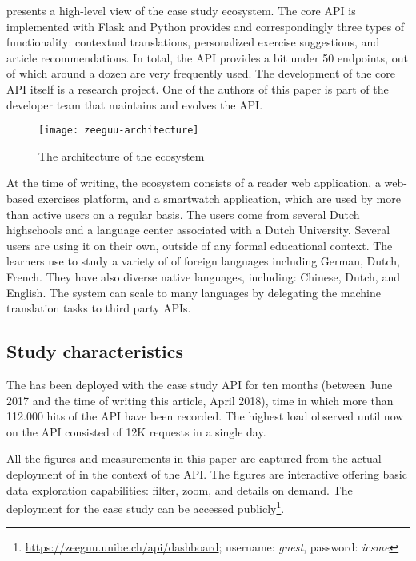    presents a high-level view of the case study ecosystem.  The core API is implemented with Flask and Python provides and correspondingly three types of functionality: contextual translations, personalized exercise suggestions, and article recommendations. In total, the API provides a bit under 50 endpoints, out of which around a dozen are very frequently used. The development of the core API itself is a research project. One of the authors of this paper is part of the developer team that maintains and evolves the \zee API. 


    \begin{figure}[h!]
      \centering
      \texttt{[image: zeeguu-architecture]}
      \caption{The architecture of the \zee ecosystem}
      \label{fig:zeeguuarch}
    \end{figure}  


  At the time of writing, the ecosystem consists of a reader web application, a web-based exercises platform, and a smartwatch application, which are used by more than \activeUserCount active users on a regular basis. The users come from several Dutch highschools and a language center associated with a Dutch University. Several users are using it on their own, outside of any formal educational context. The learners use \zee to study a variety of of foreign languages including German, Dutch, French. They have also diverse native languages, including: Chinese, Dutch, and English. The system can scale to many languages by delegating the machine translation tasks to third party APIs. 

\subsection*{Study characteristics}

  The \tool has been deployed with the case study API for 
  ten months (between June 2017 and the time of writing this
  article, April 2018), time in which more than 112.000 hits 
  of the API have been recorded. The highest load observed 
  until now on the API consisted of 12K requests in a single day. 


  All the figures and measurements in this paper are captured from the actual deployment of \tool in the context of the \zee API. The figures are interactive offering basic data exploration capabilities: filter, zoom, and details on demand\cite{Shne99a}. The \tool deployment for the case study can be accessed publicly\footnote{\url{https://zeeguu.unibe.ch/api/dashboard}; username: {\em guest}, password: {\em icsme}}. 

